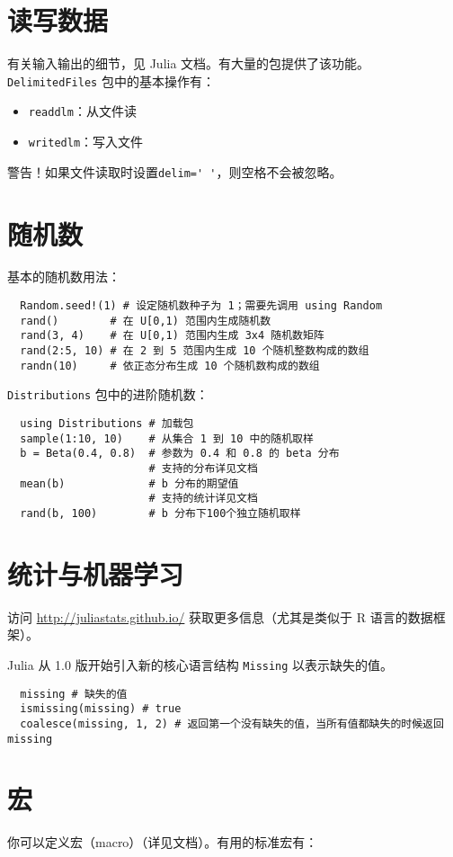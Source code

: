 \documentclass[10pt,a4paper]{article}
\begin{document}
\section{读写数据}
有关输入输出的细节，见 Julia 文档。有大量的包提供了该功能。
\lstinline|DelimitedFiles| 包中的基本操作有：
\begin{itemize}
  \item \lstinline|readdlm|：从文件读
  \item \lstinline|writedlm|：写入文件
\end{itemize}

警告！如果文件读取时设置\lstinline|delim=' '|，则空格不会被忽略。

\section{随机数}
基本的随机数用法：
\begin{lstlisting}
  Random.seed!(1) # 设定随机数种子为 1；需要先调用 using Random
  rand()        # 在 U[0,1) 范围内生成随机数
  rand(3, 4)    # 在 U[0,1) 范围内生成 3x4 随机数矩阵
  rand(2:5, 10) # 在 2 到 5 范围内生成 10 个随机整数构成的数组
  randn(10)     # 依正态分布生成 10 个随机数构成的数组
\end{lstlisting}

\lstinline|Distributions| 包中的进阶随机数：
\begin{lstlisting}
  using Distributions # 加载包
  sample(1:10, 10)    # 从集合 1 到 10 中的随机取样
  b = Beta(0.4, 0.8)  # 参数为 0.4 和 0.8 的 beta 分布
                      # 支持的分布详见文档
  mean(b)             # b 分布的期望值
                      # 支持的统计详见文档
  rand(b, 100)        # b 分布下100个独立随机取样
\end{lstlisting}

\section{统计与机器学习}
访问 \url{http://juliastats.github.io/} 获取更多信息（尤其是类似于 R 语言的数据框架）。

Julia 从 1.0 版开始引入新的核心语言结构 \lstinline|Missing| 以表示缺失的值。
\begin{lstlisting}
  missing # 缺失的值
  ismissing(missing) # true
  coalesce(missing, 1, 2) # 返回第一个没有缺失的值，当所有值都缺失的时候返回 missing
\end{lstlisting}

\section{宏}
你可以定义宏（macro）（详见文档）。有用的标准宏有：
\end{document}

